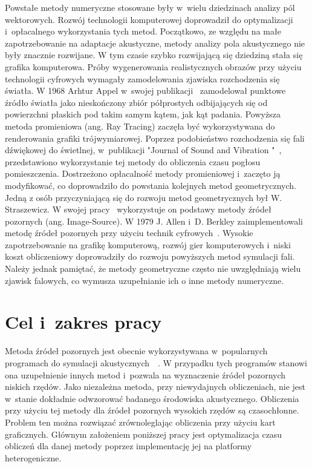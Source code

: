 Powstałe metody numeryczne stosowane były w~wielu dziedzinach analizy pól wektorowych. Rozwój technologii komputerowej doprowadził do optymalizacji i~opłacalnego wykorzystania tych metod. Początkowo, ze względu na małe zapotrzebowanie na adaptacje akustyczne, metody analizy pola akustycznego nie były znacznie rozwijane. W tym czasie szybko rozwijającą się dziedziną stała się grafika komputerowa. Próby wygenerowania realistycznych obrazów przy użyciu technologii cyfrowych wymagały zamodelowania zjawiska rozchodzenia się światła. W 1968 Arhtur Appel w~swojej publikacji~\cite{b3} zamodelował punktowe źródło światła jako nieskończony zbiór półprostych odbijających się od powierzchni płaskich pod takim samym kątem, jak kąt padania.  Powyższa  metoda promieniowa (ang. Ray Tracing) zaczęła być wykorzystywana do  renderowania grafiki trójwymiarowej. Poprzez podobieństwo rozchodzenia się fali dźwiękowej do świetlnej, w~publikacji "Journal of Sound and Vibration "~\cite{b4}, przedstawiono wykorzystanie tej metody do obliczenia czasu pogłosu pomieszczenia. Dostrzeżono opłacalność metody promieniowej i~zaczęto ją modyfikować, co doprowadziło do powstania kolejnych metod geometrycznych. Jedną z osób przyczyniającą się do rozwoju metod geometrycznych był W. Straszewicz. W swojej pracy~\cite{b5} wykorzystuje  on podstawy metody źródeł pozornych (ang. Image-Source). W 1979 J. Allen i~D. Berkley zaimplementowali  metodę źródeł pozornych przy użyciu technik cyfrowych~\cite{b6}. Wysokie zapotrzebowanie na grafikę komputerową, rozwój gier komputerowych i~niski koszt obliczeniowy doprowadziły do rozwoju powyższych metod symulacji fali. Należy jednak pamiętać, że metody geometryczne często nie uwzględniają wielu zjawisk falowych, co wymusza uzupełnianie ich o inne metody numeryczne.  



\section{Cel i~zakres pracy}\label{sec:celizakres}

Metoda źródeł pozornych jest obecnie wykorzystywana w~popularnych programach do symulacji akustycznych~\cite{b7}~\cite{b8}. W przypadku tych programów stanowi ona uzupełnienie innych metod i~pozwala na wyznaczenie źródeł pozornych niskich rzędów. Jako niezależna metoda, przy niewydajnych obliczeniach, nie jest w~stanie dokładnie odwzorować badanego środowiska akustycznego. Obliczenia przy użyciu tej metody dla źródeł pozornych wysokich rzędów są czasochłonne. Problem ten można rozwiązać zrównoleglając obliczenia przy użyciu kart graficznych. Głównym założeniem poniższej pracy jest optymalizacja czasu obliczeń dla danej metody poprzez implementację jej na platformy heterogeniczne.

